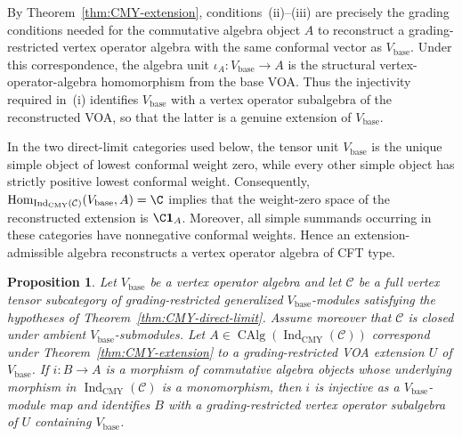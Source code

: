 \documentclass[12pt,leqno]{amsart}
\numberwithin{equation}{section} \newtheorem{thm}{Theorem}[section] \newtheorem{lem}[thm]{Lemma} \newtheorem{ex}[thm]{Example} \newtheorem{prop}[thm]{Proposition} \newtheorem{cor}[thm]{Corollary} \newtheorem{defi}[thm]{Definition} \newtheorem{rmk}[thm]{Remark} \newtheorem{notation}[thm]{Notation}
\newcommand{\one}{\mathbf{1}}
\newcommand{\Hom}{\operatorname{Hom}}
\newcommand{\CAlg}{\operatorname{CAlg}}
\newcommand{\IndCMY}{\operatorname{Ind}_{\mathrm{CMY}}}
\begin{document}
By Theorem~\ref{thm:CMY-extension}, conditions~(ii)--(iii) are precisely the grading conditions needed for the commutative algebra object $A$ to reconstruct a grading-restricted vertex operator algebra with the same conformal vector as $V_{\mathrm{base}}$. Under this correspondence, the algebra unit $\iota_A:V_{\mathrm{base}}\to A$ is the structural vertex-operator-algebra homomorphism from the base VOA. Thus the injectivity required in~(i) identifies $V_{\mathrm{base}}$ with a vertex operator subalgebra of the reconstructed VOA, so that the latter is a genuine extension of $V_{\mathrm{base}}$.

In the two direct-limit categories used below, the tensor unit $V_{\mathrm{base}}$ is the unique simple object of lowest conformal weight zero, while every other simple object has strictly positive lowest conformal weight. Consequently, $\Hom_{\IndCMY(\mathcal C)}(V_{\mathrm{base}},A)=\C$ implies that the weight-zero space of the reconstructed extension is $\C\one_A$. Moreover, all simple summands occurring in these categories have nonnegative conformal weights. Hence an extension-admissible algebra reconstructs a vertex operator algebra of CFT type.

\begin{prop}\label{prop:subalgebra-interface}
Let $V_{\mathrm{base}}$ be a vertex operator algebra and let $\mathcal C$ be a full vertex tensor subcategory of grading-restricted generalized $V_{\mathrm{base}}$-modules satisfying the hypotheses of Theorem~\ref{thm:CMY-direct-limit}. Assume moreover that $\mathcal C$ is closed under ambient $V_{\mathrm{base}}$-submodules. Let $A\in\CAlg(\IndCMY(\mathcal C))$ correspond under Theorem~\ref{thm:CMY-extension} to a grading-restricted VOA extension $U$ of $V_{\mathrm{base}}$. If $i:B\to A$ is a morphism of commutative algebra objects whose underlying morphism in $\IndCMY(\mathcal C)$ is a monomorphism, then $i$ is injective as a $V_{\mathrm{base}}$-module map and identifies $B$ with a grading-restricted vertex operator subalgebra of $U$ containing $V_{\mathrm{base}}$.
\end{prop}
\end{document}
